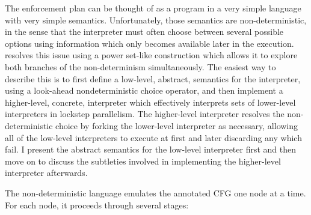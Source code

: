 The enforcement plan can be thought of as a program in a very simple
language with very simple semantics.  Unfortunately, those semantics
are non-deterministic, in the sense that the interpreter must often
choose between several possible options using information which only
becomes available later in the execution.  {\Technique} resolves this
issue using a power set-like construction which allows it to explore both branches of
the non-determinism simultaneously.  The easiest way to describe this
is to first define a low-level, abstract, semantics for the
interpreter, using a look-ahead nondeterministic choice operator, and
then implement a higher-level, concrete, interpreter which effectively
interprets sets of lower-level interpreters in lockstep parallelism.
The higher-level interpreter resolves the non-deterministic choice by
forking the lower-level interpreter as necessary, allowing all of the
low-level interpreters to execute at first and later discarding any
which fail.  I present the abstract semantics for the low-level
interpreter first and then move on to discuss the subtleties involved
in implementing the higher-level interpreter afterwards.


The non-deterministic language emulates the annotated CFG one node at
a time.  For each node, it proceeds through several stages:

